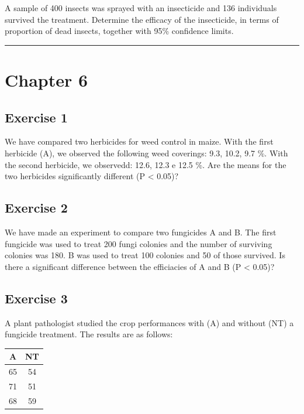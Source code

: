 \documentclass[a4paper,12pt,oneside]{book}
\begin{document}
A sample of 400 insects was sprayed with an insecticide and 136 individuals survived the treatment. Determine the efficacy of the insecticide, in terms of proportion of dead insects, together with 95\% confidence limits.

\begin{center}\rule{0.5\linewidth}{0.5pt}\end{center}

\hypertarget{chapter-6}{%
\section{Chapter 6}\label{chapter-6}}

\hypertarget{exercise-1-3}{%
\subsection{Exercise 1}\label{exercise-1-3}}

We have compared two herbicides for weed control in maize. With the first herbicide (A), we observed the following weed coverings: 9.3, 10.2, 9.7 \%. With the second herbicide, we observedd: 12.6, 12.3 e 12.5 \%. Are the means for the two herbicides significantly different (P \textless{} 0.05)?

\hypertarget{exercise-2-3}{%
\subsection{Exercise 2}\label{exercise-2-3}}

We have made an experiment to compare two fungicides A and B. The first fungicide was used to treat 200 fungi colonies and the number of surviving colonies was 180. B was used to treat 100 colonies and 50 of those survived. Is there a significant difference between the efficiacies of A and B (P \textless{} 0.05)?

\hypertarget{exercise-3-3}{%
\subsection{Exercise 3}\label{exercise-3-3}}

A plant pathologist studied the crop performances with (A) and without (NT) a fungicide treatment. The results are as follows:

\begin{longtable}[]{@{}cc@{}}
\toprule
A & NT \\
\midrule
\endhead
65 & 54 \\
71 & 51 \\
68 & 59 \\
\bottomrule
\end{longtable}
\end{document}
